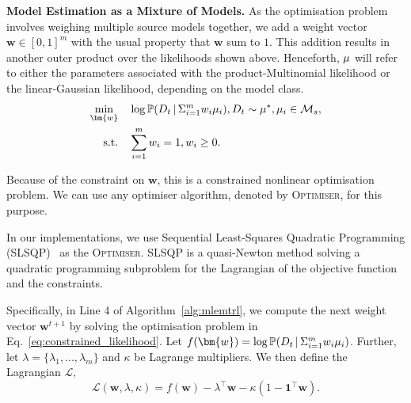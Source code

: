 \noindent\textbf{Model Estimation as a Mixture of Models.}
As the optimisation problem involves weighing multiple source models together, we add a weight vector $\bm{w} \in [0, 1]^{m}$ with the usual property that $\bm{w}$ sum to $1$. This addition results in another outer product over the likelihoods shown above. Henceforth, $\mu$ will refer to either the parameters associated with the product-Multinomial likelihood or the linear-Gaussian likelihood, depending on the model class.
\begin{equation}\label{eq:constrained_likelihood}
\begin{aligned}
\underset{\bm{w}}{\min} \quad &\log \mathbb{P}(D_t \, | \, \Sigma_{i=1}^m w_i \mdp_i), D_t \sim \mdp^{*}, \mdp_i\in\mathcal{M}_s,\\
\textrm{s.t.} \quad & \sum_{i=1}^m w_i = 1, w_i\geq0.\\
\end{aligned}
\end{equation}

Because of the constraint on $\bm{w}$, this is a constrained nonlinear optimisation problem. We can use any optimiser algorithm, denoted by \textsc{Optimiser}, for this purpose.

 In our implementations, we use Sequential Least-Squares Quadratic Programming (SLSQP)~\citep{kraft1988software} as the \textsc{Optimiser}. SLSQP is a quasi-Newton method solving a quadratic programming subproblem for the Lagrangian of the objective function and the constraints.

Specifically, in Line 4 of Algorithm~\ref{alg:mlemtrl}, we compute the next weight vector $\bm{w}^{t+1}$ by solving the optimisation problem in Eq.~\eqref{eq:constrained_likelihood}. Let $f(\bm{w}) = \log \mathbb{P}(D_t \, | \, \Sigma_{i=1}^m w_i \mdp_i)$. Further, let $\lambda=\{\lambda_1,\hdots,\lambda_m\}$ and $\kappa$ be Lagrange multipliers. We then define the Lagrangian $\mathcal{L},$
\begin{equation}
    \mathcal{L}(\bm{w}, \lambda,\kappa) = f(\bm{w})-\lambda^\top\bm{w}-\kappa(1-\mathbf{1}^\top\bm{w}).
\end{equation}


